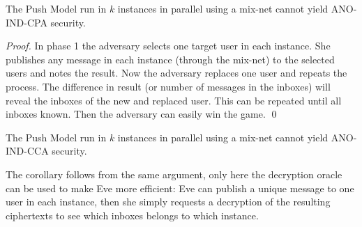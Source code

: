 \begin{theorem}
  The Push Model run in \(k\) instances in parallel using a mix-net cannot 
  yield ANO-IND-CPA security.
\end{theorem}

\begin{proof}
  In phase 1 the adversary selects one target user in each instance.
  She publishes any message in each instance (through the mix-net) to the 
  selected users and notes the result.
  Now the adversary replaces one user and repeats the process.
  The difference in result (or number of messages in the inboxes) will reveal 
  the inboxes of the new and replaced user.
  This can be repeated until all inboxes known.
  Then the adversary can easily win the game.
  \qed{}
\end{proof}

\begin{corollary}
  The Push Model run in \(k\) instances in parallel using a mix-net cannot 
  yield ANO-IND-CCA security.
\end{corollary}

The corollary follows from the same argument, only here the decryption oracle 
can be used to make Eve more efficient:
Eve can publish a unique message to one user in each instance, then she simply 
requests a decryption of the resulting ciphertexts to see which inboxes belongs 
to which instance.

